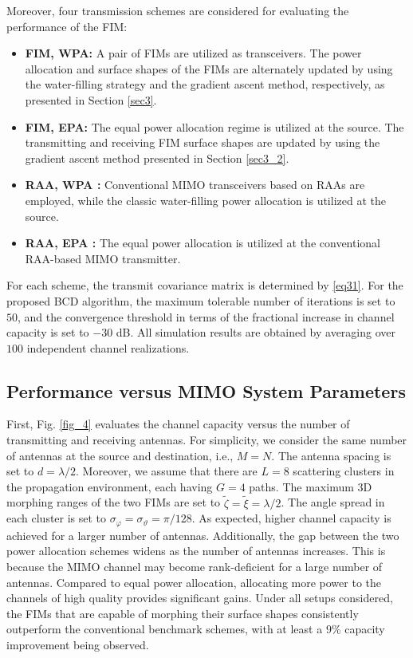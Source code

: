 \documentclass[lettersize,journal]{IEEEtran}
\begin{document}
Moreover, four transmission schemes are considered for evaluating the performance of the FIM:
\begin{itemize}
 \item \textbf{FIM, WPA:} A pair of FIMs are utilized as transceivers. The power allocation and surface shapes of the FIMs are alternately updated by using the water-filling strategy and the gradient ascent method, respectively, as presented in Section \ref{sec3}.
 \item \textbf{FIM, EPA:} The equal power allocation regime is utilized at the source. The transmitting and receiving FIM surface shapes are updated by using the gradient ascent method presented in Section \ref{sec3_2}.
 \item \textbf{RAA, WPA \cite{JSAC_2003_Goldsmith_Capacity}:} Conventional MIMO transceivers based on RAAs are employed, while the classic water-filling power allocation is utilized at the source.
 \item \textbf{RAA, EPA \cite{JSAC_2003_Goldsmith_Capacity}:} The equal power allocation is utilized at the conventional RAA-based MIMO transmitter.
\end{itemize}
For each scheme, the transmit covariance matrix is determined by \eqref{eq31}. For the proposed BCD algorithm, the maximum tolerable number of iterations is set to $50$, and the convergence threshold in terms of the fractional increase in channel capacity is set to $-30$ dB. All simulation results are obtained by averaging over $100$ independent channel realizations.


\subsection{Performance versus MIMO System Parameters}\label{sec64}
First, Fig. \ref{fig_4} evaluates the channel capacity versus the number of transmitting and receiving antennas. For simplicity, we consider the same number of antennas at the source and destination, i.e., $M = N$. The antenna spacing is set to $d = \lambda/2$. Moreover, we assume that there are $L = 8$ scattering clusters in the propagation environment, each having $G = 4$ paths. The maximum 3D morphing ranges of the two FIMs are set to $\tilde{\zeta} = \tilde{\xi} = \lambda/2$. The angle spread in each cluster is set to $\sigma_{\varphi} = \sigma_{\vartheta} = \pi/128$. As expected, higher channel capacity is achieved for a larger number of antennas. Additionally, the gap between the two power allocation schemes widens as the number of antennas increases. This is because the MIMO channel may become rank-deficient for a large number of antennas. Compared to equal power allocation, allocating more power to the channels of high quality provides significant gains. Under all setups considered, the FIMs that are capable of morphing their surface shapes consistently outperform the conventional benchmark schemes, with at least a $9$\% capacity improvement being observed.
\end{document}
